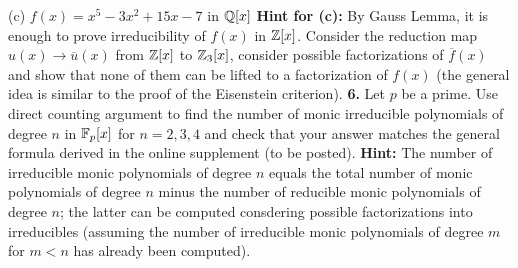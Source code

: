\documentclass[12pt]{article}
\begin{document}
(c) $f(x)=x^5-3x^2+15x-7$ in ${\mathbb Q}[x]$
\skv
{\bf Hint for (c):} By Gauss Lemma, it is enough to prove irreducibility
of $f(x)$ in ${\mathbb Z}[x]$. Consider the reduction map $u(x)\to \overline u(x)$
from ${\mathbb Z}[x]$ to ${\mathbb Z}_3[x]$, consider possible factorizations of
$\overline f(x)$ and show that none of them can be lifted to a factorization
of $f(x)$ (the general idea is similar to the proof of the Eisenstein criterion).
\skv
{\bf 6.} Let $p$ be a prime. Use direct counting argument to find the number
of monic irreducible polynomials of degree $n$ in ${\mathbb F}_p[x]$ for $n=2,3,4$ and
check that your answer matches the general formula derived in the online supplement
(to be posted).
{\bf Hint:} The number of irreducible monic polynomials of degree $n$ equals
the total number of monic polynomials of degree $n$ minus the number
of reducible monic polynomials of degree $n$; the latter can be computed
consdering possible factorizations into irreducibles (assuming the number of 
irreducible monic polynomials of degree $m$ for $m<n$ has already been computed).
\end{document}
